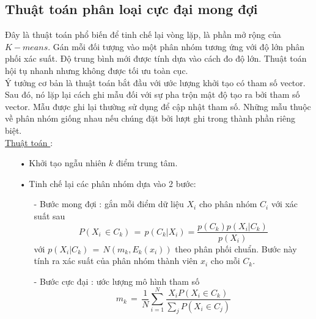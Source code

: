 \subsection{Thuật toán phân loại cực đại mong đợi}
\hspace{10mm}Đây là thuật toán phổ biến để tinh chế lại vòng lặp, là phần mở rộng của $K-means$. Gán mỗi đối tượng vào một phân nhóm tương ứng với độ lớn phân phối xác suất. Độ trung bình mới được tính dựa vào cách đo độ lớn. Thuật toán hội tụ nhanh nhưng không được tối ưu toàn cục.\\
\hspace*{10mm}Ý tưởng cơ bản là thuật toán bắt đầu với ước lượng khởi tạo có tham số vector. Sau đó, nó lặp lại cách ghi mẫu đối với sự pha trộn mật độ tạo ra bởi tham số vector. Mẫu được ghi lại thường sử dụng để cập nhật tham số. Những mẫu thuộc về phân nhóm giống nhau nếu chúng đặt bởi lượt ghi trong thành phần riêng biệt.\\
\underline{Thuật toán }:
\begin{enumerate}
\item[•]Khởi tạo ngẫu nhiên $k$ điểm trung tâm.
\item[•]Tinh chế lại các phân nhóm dựa vào 2 bước:
\begin{enumerate}
\item[-]Bước mong đợi : gắn mỗi điểm dữ liệu $X_i$ cho phân nhóm $C_i$ với xác suất sau
\begin{equation*}
P(X_i \, \in C_k) \, = \, p(C_k|X_i) = \frac{p(C_k)p(X_i|C_k)}{p(X_i)} 
\end{equation*}
với $p(X_i|C_k)\,=\,N(m_k,E_k(x_i))$ theo phân phối chuẩn. Bước này tính ra xác suất của phân nhóm thành viên $x_i$ cho mỗi $C_k$.
\item[-]Bước cực đại : ước lượng mô hình tham số
\begin{equation*}
m_k\,=\,\frac{1}{N}\sum^N_{i=1} \frac{X_i P(X_i \in C_k)}{\sum_j P(X_i \in C_j)}
\end{equation*}
\end{enumerate}
\end{enumerate}


